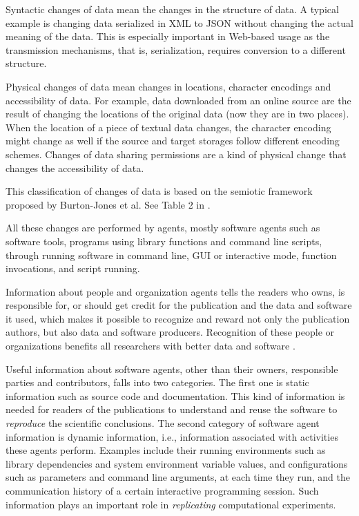 Syntactic changes of data mean the changes in the structure of data. A typical example is changing 
data serialized in XML to JSON without changing the actual meaning of the data. This is especially important in Web-based usage as the transmission mechanisms, that is, serialization, requires conversion to a different structure.

Physical changes of data mean changes in locations, character encodings and accessibility of data. 
For example, data downloaded from an online source are the result of changing the locations of the 
original data (now they are in two places). When the location of a piece of textual data changes, the 
character encoding might change as well if the source and target storages follow different encoding 
schemes. Changes of data sharing permissions are a kind of physical change that changes the 
accessibility of data. 

This classification of changes of data is based on the semiotic framework proposed by Burton-Jones et al. See Table 2 in \cite{burton2005semiotic}.

All these changes are performed by agents, mostly software agents such as software tools, programs 
using library functions and command line scripts, through running software in command line, GUI or 
interactive mode, function invocations, and script running.

Information about people and organization agents tells the readers who owns, is responsible for, or 
should get credit for the publication and the data and software it used, which makes it possible to 
recognize and reward not only the publication authors, but also data and software producers. 
Recognition of these people or organizations benefits all researchers with better data and software 
\cite{parsons2010data, goble2014better}.

Useful information about software agents, other than their owners, responsible parties and 
contributors, falls into two categories. The first one is static information such as source code and 
documentation. This kind of information is needed for readers of the publications to understand and 
reuse the software to \emph{reproduce} the scientific conclusions. The second category of software 
agent information is dynamic information, i.e., information associated with activities these agents 
perform. Examples include their running environments such as library dependencies and system 
environment variable values, and configurations such as parameters and command line arguments, at 
each time they run, and the communication history of a certain interactive programming session. Such 
information plays an important role in \emph{replicating} computational experiments.


